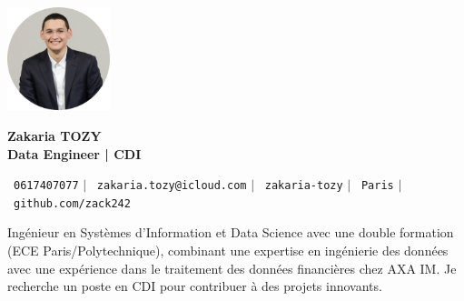 \documentclass[11pt,a4paper]{article}
\begin{document}
\begin{flushleft}
  \begin{minipage}[c]{0.2\textwidth}
    \includegraphics[width=3cm]{images/profilpicture.png}
  \end{minipage}%
  \begin{minipage}[c]{0.8\textwidth}
    {\Huge \textbf{Zakaria TOZY}} \\[5pt]
    {\Large \textbf{Data Engineer | CDI}}
  \end{minipage}
\end{flushleft}

\vspace{-5pt}

\begin{center}
    \small \faPhone\ \texttt{0617407077} \hspace{1pt} $|$
    \hspace{1pt} \faEnvelope\ \texttt{zakaria.tozy@icloud.com} \hspace{1pt} $|$
    \hspace{1pt} \faLinkedin\ \texttt{zakaria-tozy} \hspace{1pt} $|$
    \hspace{1pt} \faMapMarker\ \texttt{Paris} \hspace{1pt} $|$
    \hspace{1pt} \faGithub\ \texttt{github.com/zack242} \\ \vspace{0pt}
\end{center}

\begin{itemize}[leftmargin=0in, label={}]
\footnotesize{\item{
Ingénieur en Systèmes d'Information et Data Science avec une double formation (ECE Paris/Polytechnique), combinant une expertise en ingénierie des données avec une expérience dans le traitement des données financières chez AXA IM. Je recherche un poste en CDI pour contribuer à des projets innovants.
}}
\end{itemize}
\end{document}
